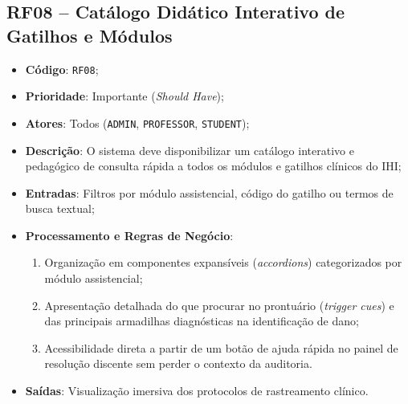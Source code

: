 \subsection{RF08 -- Catálogo Didático Interativo de Gatilhos e Módulos}
\begin{itemize}
    \item \textbf{Código}: \texttt{RF08};
    \item \textbf{Prioridade}: Importante (\textit{Should Have});
    \item \textbf{Atores}: Todos (\texttt{ADMIN}, \texttt{PROFESSOR}, \texttt{STUDENT});
    \item \textbf{Descrição}: O sistema deve disponibilizar um catálogo interativo e pedagógico de consulta rápida a todos os módulos e gatilhos clínicos do IHI;
    \item \textbf{Entradas}: Filtros por módulo assistencial, código do gatilho ou termos de busca textual;
    \item \textbf{Processamento e Regras de Negócio}:
    \begin{enumerate}
        \item Organização em componentes expansíveis (\textit{accordions}) categorizados por módulo assistencial;
        \item Apresentação detalhada do que procurar no prontuário (\textit{trigger cues}) e das principais armadilhas diagnósticas na identificação de dano;
        \item Acessibilidade direta a partir de um botão de ajuda rápida no painel de resolução discente sem perder o contexto da auditoria.
    \end{enumerate}
    \item \textbf{Saídas}: Visualização imersiva dos protocolos de rastreamento clínico.
\end{itemize}

